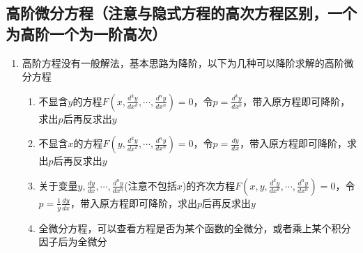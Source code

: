 \documentclass[12pt,a4paper,UTF8]{book}
\begin{document}
\subsection{高阶微分方程（注意与隐式方程的高次方程区别，一个为高阶一个为一阶高次）}
\begin{enumerate}
\item 高阶方程没有一般解法，基本思路为降阶，以下为几种可以降阶求解的高阶微分方程
\begin{enumerate}
\item 不显含$y$的方程$F\left(x,\frac{d^ky}{dx^k},\cdots,\frac{d^ny}{dx^n}\right)=0$，令$p=\frac{d^ky}{dx^k}$，带入原方程即可降阶，求出$p$后再反求出$y$
\item 不显含$x$的方程$F\left(y,\frac{d^ky}{dx^k},\cdots,\frac{d^ny}{dx^n}\right)=0$，令$p=\frac{dy}{dx}$，带入原方程即可降阶，求出$p$后再反求出$y$
\item 关于变量$y,\frac{dy}{dx},\cdots,\frac{d^ny}{dx^n}$(注意不包括$x$)的齐次方程$F\left(x,y,\frac{d^ky}{dx^k},\cdots,\frac{d^ny}{dx^n}\right)=0$，令$p=\frac{1}{y}\frac{dy}{dx}$，带入原方程即可降阶，求出$p$后再反求出$y$
\item 全微分方程，可以查看方程是否为某个函数的全微分，或者乘上某个积分因子后为全微分
\end{enumerate}
\end{enumerate}
\end{document}
